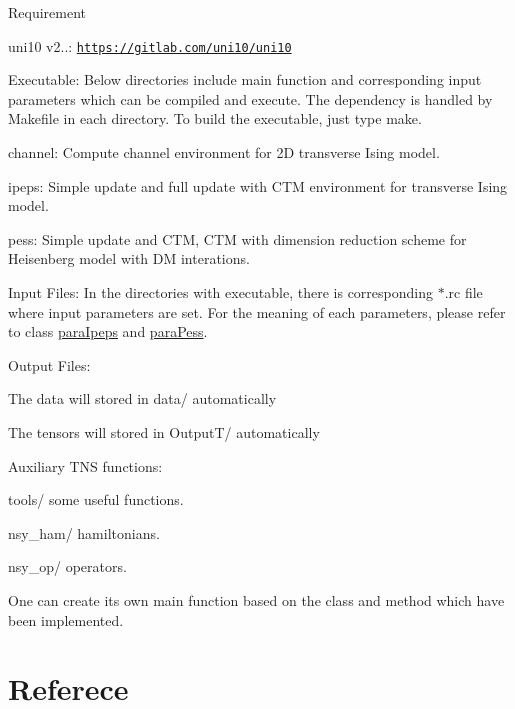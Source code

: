 \begin{DoxyItemize}
\item Requirement
\begin{DoxyItemize}
\item uni10 v2..\+: \href{https://gitlab.com/uni10/uni10}{\tt https\+://gitlab.\+com/uni10/uni10}
\end{DoxyItemize}
\item Executable\+: Below directories include main function and corresponding input parameters which can be compiled and execute. The dependency is handled by Makefile in each directory. To build the executable, just type {\ttfamily make}.
\begin{DoxyItemize}
\item channel\+: Compute channel environment for 2D transverse Ising model.
\item ipeps\+: Simple update and full update with C\+TM environment for transverse Ising model.
\item pess\+: Simple update and C\+TM, C\+TM with dimension reduction scheme for Heisenberg model with DM interations.
\end{DoxyItemize}
\item Input Files\+: In the directories with executable, there is corresponding $\ast$.rc file where input parameters are set. For the meaning of each parameters, please refer to class {\ttfamily \hyperlink{structparaIpeps}{para\+Ipeps}} and {\ttfamily \hyperlink{structparaPess}{para\+Pess}}.
\item Output Files\+:
\begin{DoxyItemize}
\item The data will stored in data/ automatically
\item The tensors will stored in Output\+T/ automatically
\end{DoxyItemize}
\item Auxiliary T\+NS functions\+:
\begin{DoxyItemize}
\item tools/ some useful functions.
\item nsy\+\_\+ham/ hamiltonians.
\item nsy\+\_\+op/ operators.
\end{DoxyItemize}
\item One can create its own main function based on the class and method which have been implemented.
\end{DoxyItemize}\hypertarget{index_Referece}{}\section{Referece}\label{index_Referece}

